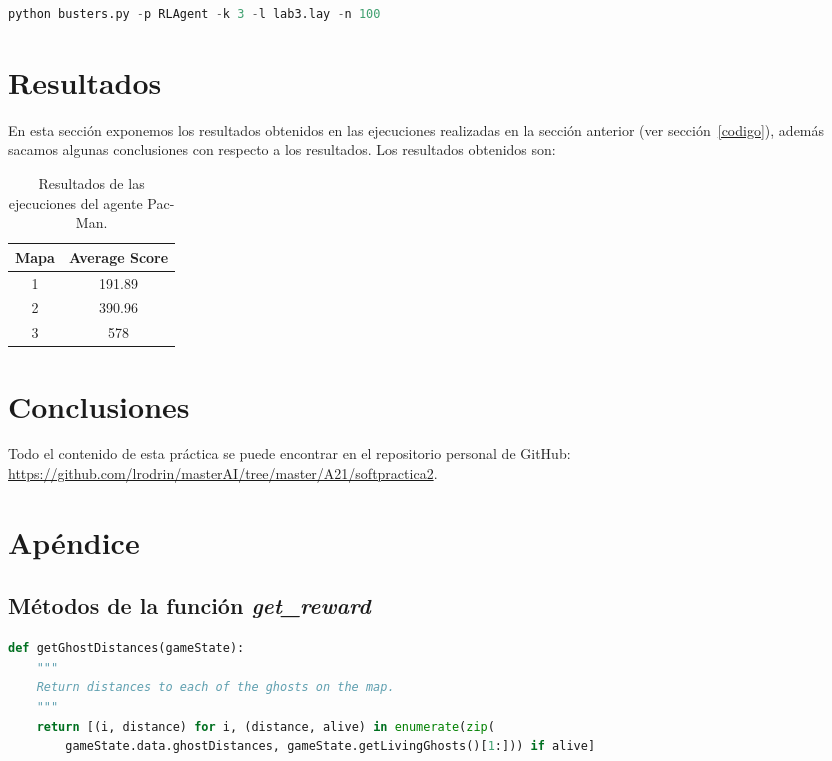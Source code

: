 \documentclass[11pt]{exam}
\begin{document}
\begin{lstlisting}[language=python, basicstyle=\footnotesize]
python busters.py -p RLAgent -k 3 -l lab3.lay -n 100
\end{lstlisting}

\section{Resultados}\label{resultados}

En esta sección exponemos los resultados obtenidos en las ejecuciones realizadas en la sección anterior (ver sección~\ref{codigo}), además sacamos algunas conclusiones con respecto a los resultados. Los resultados obtenidos son:

\begin{table}[H]
	\centering
	\begin{tabular}{|c|c|} 
		\hline
		Mapa & Average Score \\ 
		\hline
		1 & 191.89 \\ 
		2 & 390.96 \\
		3 & 578 \\
		\hline
	\end{tabular}
	\caption{Resultados de las ejecuciones del agente Pac-Man.}
	\label{resultados_ejecuciones}
\end{table}
\section{Conclusiones}\label{conclusiones}


Todo el contenido de esta práctica se puede encontrar en el repositorio personal de GitHub: \url{https://github.com/lrodrin/masterAI/tree/master/A21/softpractica2}.

\section{Apéndice}\label{apendice}

\subsection{Métodos de la función \textit{get\_reward}}\label{apendice_reward}

\begin{lstlisting}[caption={Función getGhostDistances.}, label={getGhostDistances}, language=python, basicstyle=\footnotesize]
def getGhostDistances(gameState):
	"""
	Return distances to each of the ghosts on the map.
	"""
	return [(i, distance) for i, (distance, alive) in enumerate(zip(
		gameState.data.ghostDistances, gameState.getLivingGhosts()[1:])) if alive]
\end{lstlisting}
\end{document}
